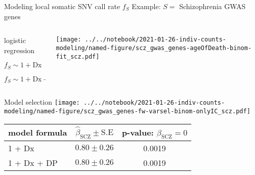 \documentclass[usenames,dvipsnames]{beamer}
\begin{document}
\begin{frame}{Modeling local somatic SNV call rate $f_S$}
	{Example: $S =$ Schizophrenia GWAS genes}
\begin{columns}[t]
\begin{column}{0.5\textwidth}
\begin{center}
logistic regression
\begin{description}
\tiny
\item[M0] \(f_S \sim 1 + \mathrm{Dx}\)
\item[M1] \(f_S \sim 1 + \mathrm{Dx} + \mathrm{ageOfDeath}\)
\end{description}
\end{center}
\end{column}

\begin{column}{0.5\textwidth}

\texttt{[image: ../../notebook/2021-01-26-indiv-counts-modeling/named-figure/scz\_gwas\_genes-ageOfDeath-binom-fit\_scz.pdf]}
\end{column}
\end{columns}
\end{frame}

\begin{frame}{Model selection}
\small
\texttt{[image: ../../notebook/2021-01-26-indiv-counts-modeling/named-figure/scz\_gwas\_genes-fw-varsel-binom-onlyIC\_scz.pdf]}

\begin{center}
\tiny
\begin{tabular}{l|cc}
model formula & \(\hat{\beta}_\mathrm{SCZ} \pm \mathrm{S.E}\) & p-value: \(\beta_\mathrm{SCZ} = 0\) \\
\hline
1 + Dx & \(0.80 \pm 0.26\) & 0.0019 \\
1 + Dx + DP & \(0.80 \pm 0.26\) & 0.0019 \\
\end{tabular}
\end{center}
\end{frame}
\end{document}
